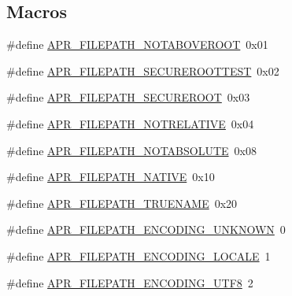 \subsection*{Macros}
\begin{DoxyCompactItemize}
\item 
\#define \hyperlink{group__apr__filepath_gabb57ce7b23caf512d7f64b92a662ab3d}{A\+P\+R\+\_\+\+F\+I\+L\+E\+P\+A\+T\+H\+\_\+\+N\+O\+T\+A\+B\+O\+V\+E\+R\+O\+OT}~0x01
\item 
\#define \hyperlink{group__apr__filepath_ga48b6cabfa91e6070c45977ba7035f328}{A\+P\+R\+\_\+\+F\+I\+L\+E\+P\+A\+T\+H\+\_\+\+S\+E\+C\+U\+R\+E\+R\+O\+O\+T\+T\+E\+ST}~0x02
\item 
\#define \hyperlink{group__apr__filepath_ga6a518889311b81e1d2fc434e7d3acecd}{A\+P\+R\+\_\+\+F\+I\+L\+E\+P\+A\+T\+H\+\_\+\+S\+E\+C\+U\+R\+E\+R\+O\+OT}~0x03
\item 
\#define \hyperlink{group__apr__filepath_ga487344eb474ea4033b19c386db9aa03a}{A\+P\+R\+\_\+\+F\+I\+L\+E\+P\+A\+T\+H\+\_\+\+N\+O\+T\+R\+E\+L\+A\+T\+I\+VE}~0x04
\item 
\#define \hyperlink{group__apr__filepath_gaac75b8e9fd5c248b52ac36a1fd6b7f98}{A\+P\+R\+\_\+\+F\+I\+L\+E\+P\+A\+T\+H\+\_\+\+N\+O\+T\+A\+B\+S\+O\+L\+U\+TE}~0x08
\item 
\#define \hyperlink{group__apr__filepath_ga2d72ade2cada76d2fa8af3fe4d8fb1de}{A\+P\+R\+\_\+\+F\+I\+L\+E\+P\+A\+T\+H\+\_\+\+N\+A\+T\+I\+VE}~0x10
\item 
\#define \hyperlink{group__apr__filepath_gafb7dd411e9ef212a03051806cb60c9d8}{A\+P\+R\+\_\+\+F\+I\+L\+E\+P\+A\+T\+H\+\_\+\+T\+R\+U\+E\+N\+A\+ME}~0x20
\item 
\#define \hyperlink{group__apr__filepath_ga26cd6345ccc38ae3ad001fd2fa885634}{A\+P\+R\+\_\+\+F\+I\+L\+E\+P\+A\+T\+H\+\_\+\+E\+N\+C\+O\+D\+I\+N\+G\+\_\+\+U\+N\+K\+N\+O\+WN}~0
\item 
\#define \hyperlink{group__apr__filepath_gaecb3193c8e36fbf58564f94b8c38b6d9}{A\+P\+R\+\_\+\+F\+I\+L\+E\+P\+A\+T\+H\+\_\+\+E\+N\+C\+O\+D\+I\+N\+G\+\_\+\+L\+O\+C\+A\+LE}~1
\item 
\#define \hyperlink{group__apr__filepath_ga1c99d1644a8b49dc0be166bdc352819a}{A\+P\+R\+\_\+\+F\+I\+L\+E\+P\+A\+T\+H\+\_\+\+E\+N\+C\+O\+D\+I\+N\+G\+\_\+\+U\+T\+F8}~2
\end{DoxyCompactItemize}

